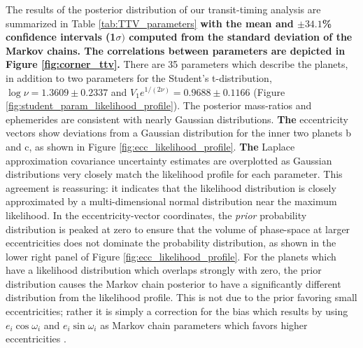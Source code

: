 \documentclass[twocolumn]{aastex63}
\begin{document}
The results of the posterior distribution of our transit-timing analysis are summarized
in Table \ref{tab:TTV_parameters} \textbf{with the mean and ${\pm}34.1$\% confidence intervals (1$\sigma)$
computed from the standard deviation of the Markov chains.  The correlations between
parameters are depicted in Figure \ref{fig:corner_ttv}.} There are 35 parameters
which describe the planets, in addition to two parameters
for the Student's t-distribution, $ \log{\nu} = 1.3609{\pm}0.2337$
and $ V_1 e^{1/(2\nu)} = 0.9688{\pm}0.1166$ (Figure \ref{fig:student_param_likelihood_profile}).  The posterior mass-ratios
and ephemerides are consistent with nearly Gaussian distributions. \textbf{The}
eccentricity vectors show deviations from a Gaussian distribution for the inner
two planets b and c, as shown in Figure \ref{fig:ecc_likelihood_profile}.  %
\textbf{The} Laplace approximation covariance uncertainty estimates are overplotted as
Gaussian distributions very closely match the likelihood profile
for each parameter.  This agreement is reassuring:  it indicates
that the likelihood distribution is closely approximated by
a multi-dimensional normal distribution near the maximum likelihood.
In the eccentricity-vector coordinates,
the {\it prior} probability distribution is peaked
at zero to ensure that the volume of phase-space at larger
eccentricities does not dominate the probability distribution,
as shown in the lower right panel of Figure \ref{fig:ecc_likelihood_profile}.
For the planets which have
a likelihood distribution which overlaps strongly with zero,
the prior distribution causes the Markov chain posterior to
have a significantly different distribution from the likelihood profile.  This is not
due to the prior favoring small eccentricities;  rather it is simply
a correction for the bias which results by using $e_i\cos{\omega_i}$
and $e_i\sin{\omega_i}$ as Markov chain parameters which favors
higher eccentricities \citep{Ford2006}.
\end{document}
